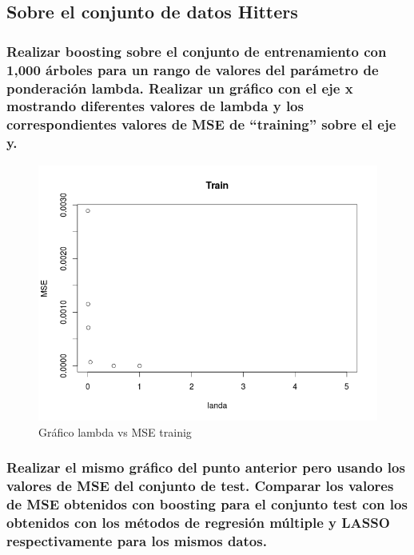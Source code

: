 \subsection{Sobre el conjunto de datos Hitters}

\subsubsection{Realizar boosting sobre el conjunto de entrenamiento con 1,000 árboles para un rango de valores del parámetro de ponderación lambda. Realizar un gráfico con el eje x mostrando diferentes valores de lambda y los correspondientes valores de MSE de ``training'' sobre el eje y.}

\begin{figure}[H]
\centering
\includegraphics[scale=0.60]{ej3-2.png}
\caption{Gráfico lambda vs MSE trainig}
\label{}
\end{figure}

\subsubsection{Realizar el mismo gráfico del punto anterior pero usando los valores de MSE del conjunto de test. Comparar los valores de MSE obtenidos con boosting para el conjunto test con los obtenidos con los métodos de regresión múltiple y LASSO respectivamente para los mismos datos.}

